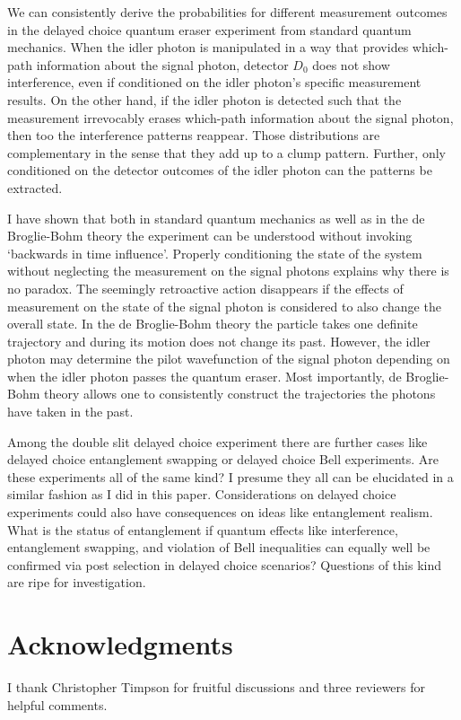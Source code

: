 \documentclass[11pt]{article}
\numberwithin{equation}{section}
\begin{document}
We can consistently derive the probabilities for different measurement outcomes in the delayed choice quantum eraser experiment from standard quantum mechanics. When the idler photon is manipulated in a way that provides which-path information about the signal photon, detector $D_0$ does not show interference, even if conditioned on the idler photon's specific measurement results. On the other hand, if the idler photon is detected such that the measurement irrevocably erases  which-path information about the signal photon, then too the interference patterns reappear. Those distributions are complementary in the sense that they add up to a clump pattern. Further, only conditioned on the detector outcomes of the idler photon can the patterns be extracted.

I have shown that both in standard quantum mechanics as well as in the de Broglie-Bohm theory the experiment can be understood without invoking `backwards in time influence'. Properly conditioning the state of the system without neglecting the measurement on the signal photons explains why there is no paradox. The seemingly retroactive action disappears if the effects of measurement on the state of the signal photon is considered to also change the overall state. In the de Broglie-Bohm theory the particle takes one definite trajectory and during its motion does not change its past. However, the idler photon may determine the pilot wavefunction of the signal photon depending on when the idler photon passes the quantum eraser. Most importantly, de Broglie-Bohm theory allows one to consistently construct the trajectories the photons have taken in the past. 

Among the double slit delayed choice experiment there are further cases like delayed choice entanglement swapping or delayed choice Bell experiments. Are these experiments all of the same kind? I presume they all can be elucidated in a similar fashion as I did in this paper. Considerations on delayed choice experiments could also have consequences on ideas like entanglement realism. What is the status of entanglement if quantum effects like interference, entanglement swapping, and violation of Bell inequalities can equally well be confirmed via post selection in delayed choice scenarios? Questions of this kind are ripe for investigation. 

\section*{Acknowledgments}

I thank Christopher Timpson for fruitful discussions and three reviewers for helpful comments.



\end{document}
